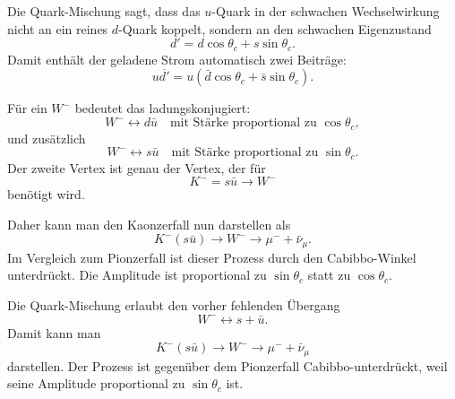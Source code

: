\documentclass[11pt,a4paper]{scrartcl}
\begin{document}
\begin{calculationbox}
Die Quark-Mischung sagt, dass das $u$-Quark in der schwachen Wechselwirkung nicht an ein reines $d$-Quark koppelt, sondern an den schwachen Eigenzustand
\[
d'=d\cos\theta_c+s\sin\theta_c.
\]
Damit enthält der geladene Strom automatisch zwei Beiträge:
\[
u\overline{d'}=u(\bar d\cos\theta_c+\bar s\sin\theta_c).
\]

\begin{calculationbox}
Für ein $W^-$ bedeutet das ladungskonjugiert:
\[
W^- \leftrightarrow d\bar u
\quad\text{mit Stärke proportional zu }\cos\theta_c,
\]
und zusätzlich
\[
W^- \leftrightarrow s\bar u
\quad\text{mit Stärke proportional zu }\sin\theta_c.
\]
Der zweite Vertex ist genau der Vertex, der für
\[
K^-=s\bar u\to W^-
\]
benötigt wird.
\end{calculationbox}

\begin{calculationbox}
Daher kann man den Kaonzerfall nun darstellen als
\[
K^-(s\bar u)\to W^-\to \mu^-+\bar\nu_\mu.
\]
Im Vergleich zum Pionzerfall ist dieser Prozess durch den Cabibbo-Winkel unterdrückt. Die Amplitude ist proportional zu $\sin\theta_c$ statt zu $\cos\theta_c$.
\end{calculationbox}

\begin{center}
\end{center}
\end{calculationbox}

\begin{answerbox}
Die Quark-Mischung erlaubt den vorher fehlenden Übergang
\[
\boxed{W^-\leftrightarrow s+\bar u}.
\]
Damit kann man
\[
\boxed{K^-(s\bar u)\to W^-\to \mu^-+\bar\nu_\mu}
\]
darstellen. Der Prozess ist gegenüber dem Pionzerfall Cabibbo-unterdrückt, weil seine Amplitude proportional zu $\sin\theta_c$ ist.
\end{answerbox}
\end{document}

